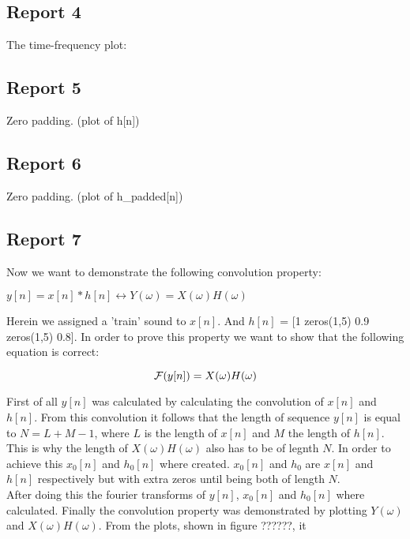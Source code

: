 \documentclass[11pt,titlepage]{report}
\begin{document}
\subsection{Report 4}
The time-frequency plot: \\

\subsection{Report 5}
Zero padding. (plot of h[n])
\subsection{Report 6}
Zero padding. (plot of h\_padded[n])

\subsection{Report 7}
Now we want to demonstrate the following convolution property: \newline

\begin{center}
 $y[n] = x[n]*h[n] \leftrightarrow Y(\omega) = X(\omega)H(\omega)$ 
\end{center}


Herein we assigned a 'train' sound to  $x[n]$.  And  $h[n]$ = [1  zeros(1,5)  0.9 zeros(1,5)  0.8].
In order to prove this property we want to show that the following equation is correct: \newline

\begin{equation}
\centering
 \mathcal{F}(y[n]) = X(\omega)H(\omega)
\end{equation}

First of all $y[n]$ was calculated by calculating the convolution of $x[n]$ and $h[n]$. From this convolution it follows that the length of sequence $y[n]$ is equal to $N = L + M - 1$, where $L$ is the length of $x[n]$ and $M$ the length of $h[n]$. This is why the length of $X(\omega)H(\omega)$ also has to be of legnth $N$. In order to achieve this $x_{0}[n]$ and $h_{0}[n]$ where created. $x_{0}[n]$ and $h_{0}$ are $x[n]$ and $h[n]$ respectively but with extra zeros until being both of length $N$. \\
After doing this the fourier transforms of $y[n]$, $x_{0}[n]$ and $h_{0}[n]$ where calculated. Finally the convolution property was demonstrated by plotting $Y(\omega)$ and $X(\omega)H(\omega)$. From the plots, shown in figure ??????, it 
\end{document}
